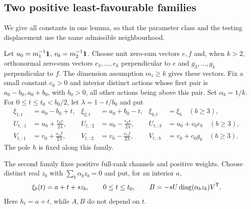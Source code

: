 \subsection{Two positive least-favourable families}
We give all constants in one lemma, so that the parameter class and the
testing displacement use the same admissible neighbourhood.

Let $u_0=m_1^{-1}\mathbf 1$, $v_0=m_2^{-1}\mathbf 1$. Choose unit zero-sum
vectors $e,f$ and, when $k>2$, orthonormal zero-sum vectors
$e_3,\ldots,e_k$ perpendicular to $e$ and
$g_3,\ldots,g_k$ perpendicular to $f$. The dimension assumption
$m_i\ge k$ gives these vectors. Fix a small constant $c_0>0$ and
interior distinct actions whose first pair is $a_0-b_0,a_0+b_0$,
with $b_0>0$, all other actions being above this pair. Set
$\alpha_b=1/k$. For $0\le t\le t_0<b_0/2$, let
$\lambda=1-t/b_0$ and put
\begin{align}
 \xi_{1,t}&=a_0-b_0+t,& \xi_{2,t}&=a_0+b_0-t,
       &\xi_{b,t}&=\xi_b\quad(b\ge3),\nonumber\\
 U_{t,:1}&=u_0+\frac{\epsilon_u e}{2\lambda},&
 U_{t,:2}&=u_0-\frac{\epsilon_u e}{2\lambda},&
 U_{t,:b}&=u_0+c_0e_b\quad(b\ge3),\label{eq:product-family}\\
 V_{t,:1}&=v_0+\frac{\epsilon_v f}{2\lambda},&
 V_{t,:2}&=v_0-\frac{\epsilon_v f}{2\lambda},&
 V_{t,:b}&=v_0+c_0g_b\quad(b\ge3).\nonumber
\end{align}
The pole $h$ is fixed along this family.

The second family fixes positive full-rank channels and positive
weights. Choose distinct real $z_b$ with $\sum_b\alpha_bz_b=0$ and
put, for an interior $a$,
\begin{equation}\label{eq:collapse-family}
 \xi_b(t)=a+t+s z_b,\qquad 0\le t\le t_0,
 \qquad B=-sU\operatorname{diag}(\alpha_bz_b)V^{\mathsf T}.
\end{equation}
Here $h_t=a+t$, while $A,B$ do not depend on $t$.

